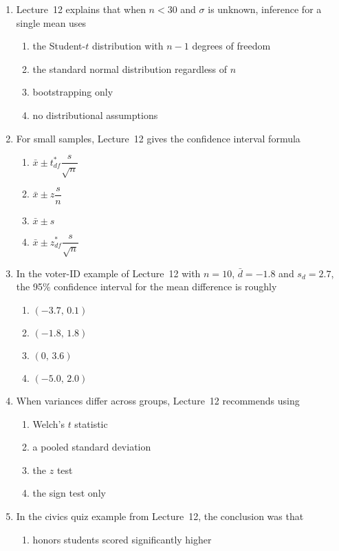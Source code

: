 \documentclass{article}
\begin{document}
\begin{enumerate}
\begin{enumerate}[label=(\Alph*)]
  \end{enumerate}
\item Lecture~12 explains that when $n<30$ and $\sigma$ is unknown, inference for a single mean uses
  \begin{enumerate}[label=(\Alph*)]
  \item the Student-$t$ distribution with $n-1$ degrees of freedom
  \item the standard normal distribution regardless of $n$
  \item bootstrapping only
  \item no distributional assumptions
  \end{enumerate}
\item For small samples, Lecture~12 gives the confidence interval formula
  \begin{enumerate}[label=(\Alph*)]
  \item $\bar{x}\pm t^*_{df}\dfrac{s}{\sqrt{n}}$
  \item $\bar{x}\pm z\dfrac{s}{n}$
  \item $\bar{x}\pm s$
  \item $\bar{x}\pm z^*_{df}\dfrac{s}{\sqrt{n}}$
  \end{enumerate}
\item In the voter-ID example of Lecture~12 with $n=10$, $\bar{d}=-1.8$ and $s_d=2.7$, the 95\% confidence interval for the mean difference is roughly
  \begin{enumerate}[label=(\Alph*)]
  \item $(-3.7,\,0.1)$
  \item $(-1.8,\,1.8)$
  \item $(0,\,3.6)$
  \item $(-5.0,\,2.0)$
  \end{enumerate}
\item When variances differ across groups, Lecture~12 recommends using
  \begin{enumerate}[label=(\Alph*)]
  \item Welch's $t$ statistic
  \item a pooled standard deviation
  \item the $z$ test
  \item the sign test only
  \end{enumerate}
\item In the civics quiz example from Lecture~12, the conclusion was that
  \begin{enumerate}[label=(\Alph*)]
  \item honors students scored significantly higher

\end{enumerate}
\end{enumerate}
\end{document}
